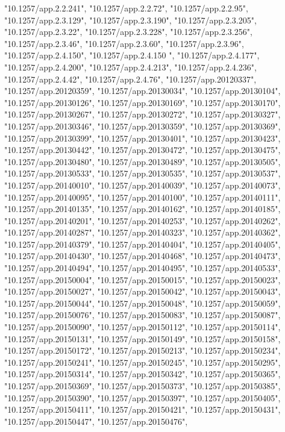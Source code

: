 \documentclass[]{article}
\begin{document}
\begin{itemize}
  "10.1257/app.2.2.241", "10.1257/app.2.2.72", "10.1257/app.2.2.95",
  "10.1257/app.2.3.129", "10.1257/app.2.3.190", "10.1257/app.2.3.205",
  "10.1257/app.2.3.22", "10.1257/app.2.3.228", "10.1257/app.2.3.256",
  "10.1257/app.2.3.46", "10.1257/app.2.3.60", "10.1257/app.2.3.96",
  "10.1257/app.2.4.150", "10.1257/app.2.4.150 ", "10.1257/app.2.4.177",
  "10.1257/app.2.4.200", "10.1257/app.2.4.213", "10.1257/app.2.4.236",
  "10.1257/app.2.4.42", "10.1257/app.2.4.76", "10.1257/app.20120337",
  "10.1257/app.20120359", "10.1257/app.20130034",
  "10.1257/app.20130104", "10.1257/app.20130126",
  "10.1257/app.20130169", "10.1257/app.20130170",
  "10.1257/app.20130267", "10.1257/app.20130272",
  "10.1257/app.20130327", "10.1257/app.20130346",
  "10.1257/app.20130359", "10.1257/app.20130369",
  "10.1257/app.20130399", "10.1257/app.20130401",
  "10.1257/app.20130423", "10.1257/app.20130442",
  "10.1257/app.20130472", "10.1257/app.20130475",
  "10.1257/app.20130480", "10.1257/app.20130489",
  "10.1257/app.20130505", "10.1257/app.20130533",
  "10.1257/app.20130535", "10.1257/app.20130537",
  "10.1257/app.20140010", "10.1257/app.20140039",
  "10.1257/app.20140073", "10.1257/app.20140095",
  "10.1257/app.20140100", "10.1257/app.20140111",
  "10.1257/app.20140135", "10.1257/app.20140162",
  "10.1257/app.20140185", "10.1257/app.20140201",
  "10.1257/app.20140253", "10.1257/app.20140262",
  "10.1257/app.20140287", "10.1257/app.20140323",
  "10.1257/app.20140362", "10.1257/app.20140379",
  "10.1257/app.20140404", "10.1257/app.20140405",
  "10.1257/app.20140430", "10.1257/app.20140468",
  "10.1257/app.20140473", "10.1257/app.20140494",
  "10.1257/app.20140495", "10.1257/app.20140533",
  "10.1257/app.20150004", "10.1257/app.20150015",
  "10.1257/app.20150023", "10.1257/app.20150027",
  "10.1257/app.20150042", "10.1257/app.20150043",
  "10.1257/app.20150044", "10.1257/app.20150048",
  "10.1257/app.20150059", "10.1257/app.20150076",
  "10.1257/app.20150083", "10.1257/app.20150087",
  "10.1257/app.20150090", "10.1257/app.20150112",
  "10.1257/app.20150114", "10.1257/app.20150131",
  "10.1257/app.20150149", "10.1257/app.20150158",
  "10.1257/app.20150172", "10.1257/app.20150213",
  "10.1257/app.20150234", "10.1257/app.20150241",
  "10.1257/app.20150245", "10.1257/app.20150295",
  "10.1257/app.20150314", "10.1257/app.20150342",
  "10.1257/app.20150365", "10.1257/app.20150369",
  "10.1257/app.20150373", "10.1257/app.20150385",
  "10.1257/app.20150390", "10.1257/app.20150397",
  "10.1257/app.20150405", "10.1257/app.20150411",
  "10.1257/app.20150421", "10.1257/app.20150431",
  "10.1257/app.20150447", "10.1257/app.20150476",

\end{itemize}
\end{document}
